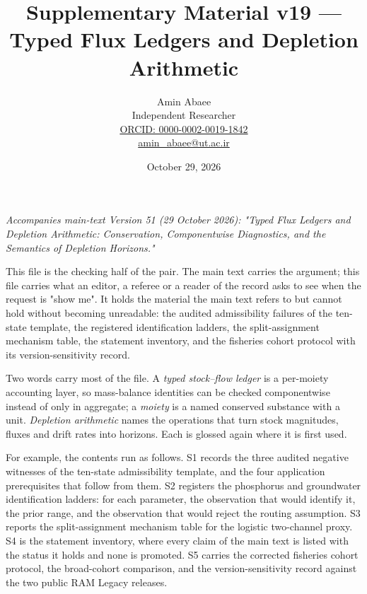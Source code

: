 \documentclass[11pt]{article}
\begin{document}
\title{Supplementary Material v19 --- Typed Flux Ledgers and Depletion Arithmetic}
\author{Amin Abaee\\[0.35em]
{\small Independent Researcher}\\[0.55em]
{\small\href{https://orcid.org/\allowbreak{}0000-0002-0019-1842}{ORCID: 0000-0002-0019-1842}}\\[0.3em]
{\small\href{mailto:amin\_abaee@ut.ac.ir}{amin\_abaee@ut.ac.ir}}}
\date{October 29, 2026}
\maketitle

\emph{Accompanies main-text Version 51 (29 October 2026): "Typed Flux Ledgers and Depletion Arithmetic: Conservation, Componentwise Diagnostics, and the Semantics of Depletion Horizons."}

This file is the checking half of the pair. The main text carries the argument; this file carries what an editor, a referee or a reader of the record asks to see when the request is "show me". It holds the material the main text refers to but cannot hold without becoming unreadable: the audited admissibility failures of the ten-state template, the registered identification ladders, the split-assignment mechanism table, the statement inventory, and the fisheries cohort protocol with its version-sensitivity record.

Two words carry most of the file. A \emph{typed stock--flow ledger} is a per-moiety accounting layer, so mass-balance identities can be checked componentwise instead of only in aggregate; a \emph{moiety} is a named conserved substance with a unit. \emph{Depletion arithmetic} names the operations that turn stock magnitudes, fluxes and drift rates into horizons. Each is glossed again where it is first used.

For example, the contents run as follows. S1 records the three audited negative witnesses of the ten-state admissibility template, and the four application prerequisites that follow from them. S2 registers the phosphorus and groundwater identification ladders: for each parameter, the observation that would identify it, the prior range, and the observation that would reject the routing assumption. S3 reports the split-assignment mechanism table for the logistic two-channel proxy. S4 is the statement inventory, where every claim of the main text is listed with the status it holds and none is promoted. S5 carries the corrected fisheries cohort protocol, the broad-cohort comparison, and the version-sensitivity record against the two public RAM Legacy releases.
\end{document}
